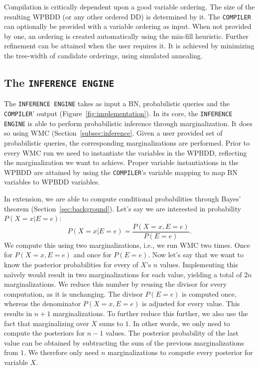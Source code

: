 Compilation is critically dependent upon a good variable ordering. The size of the resulting WPBDD (or any other ordered DD) is determined by it. The \texttt{COMPILER} can optionally be provided with a variable ordering as input. When not provided by one, an ordering is created automatically using the min-fill heuristic. Further refinement can be attained when the user requires it. It is achieved by minimizing the tree-width of candidate orderings, using simulated annealing.

\subsection{The \texttt{INFERENCE ENGINE}}

The \texttt{INFERENCE ENGINE} takes as input a BN, probabilistic queries and the \texttt{COMPILER}' output (Figure~\ref{fig:implementation}). In its core, the \texttt{INFERENCE ENGINE} is able to perform probabilistic inference through marginalization. It does so using WMC (Section~\ref{subsec:inference}. Given a user provided set of probabilistic queries, the corresponding marginalizations are performed. Prior to every WMC run we need to instantiate the variables in the WPBDD, reflecting the marginalization we want to achieve. Proper variable instantiations in the WPBDD are attained by using the \texttt{COMPILER}'s variable mapping to map BN variables to WPBDD variables.

In extension, we are able to compute conditional probabilities through Bayes' theorem (Section~\ref{sec:background}). Let's say we are interested in probability $P(X = x | E = e)$:  \[P(X = x | E = e) = \frac{P(X = x, E = e)}{P(E = e)}.\]
We compute this using two marginalizations, i.e., we run WMC two times. Once for $P(X = x, E = e)$ and once for $P(E = e)$. Now let's say that we want to know the posterior probabilities for every of $X$'s $n$ values. Implementing this na\"ively would result in two marginalizations for each value, yielding a total of $2n$ marginalizations. We reduce this number by reusing the divisor for every computation, as it is unchanging. The divisor $P(E = e)$ is computed once, whereas the denominator $P(X = x, E = e)$ is adjusted for every value. This results in $n + 1$ marginalizations. To further reduce this further, we also use the fact that marginalizing over $X$ sums to $1$. In other words, we only need to compute the posteriors for $n-1$ values. The posterior probability of the last value can be obtained by subtracting the sum of the previous marginalizations from $1$. We therefore only need $n$ marginalizations to compute every posterior for variable $X$.

